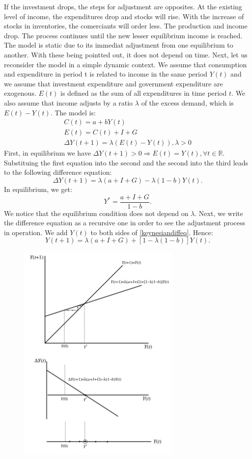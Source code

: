 \documentclass[a4paper,11pt]{report}
\newcommand{\R}{\mathbb{R}}
\begin{document}
If the investment drops, the steps for adjustment are opposites. At the existing level of income, the expenditures drop and stocks will rise. With the increase of stocks in inventories, the comerciants will order less. The production and income drop. The process continues until the new lesser equilibrium income is reached. The model is static due to its immediat adjustment from one equilibrium to another. With these being pointted out, it does not depend on time. Next, let us reconsider the model in a simple dynamic context. We assume that consumption and expenditure in period t is related to income in the same period $Y(t)$ and we assume that investment expenditure and government expenditure are exogenous. $E(t)$ is defined as the sum of all expenditures in time period $t$. We also assume that income adjusts by a ratio $\lambda$ of the excess demand, which is $E(t)-Y(t)$. The model is:
\begin{align*}
 C(t)=a+bY(t)\\
 E(t)=C(t)+I+G\\
 \Delta Y(t+1)=\lambda(E(t)-Y(t)), \lambda>0
\end{align*}
First, in equilibrium we have $\Delta Y(t+1)>0\Rightarrow E(t)=Y(t),\forall t\in\R$. Substituing the first equation into the second and the second into the third leads to the following difference equation:
\begin{equation}\label{keynesiandiffeq}
 \Delta Y(t+1)=\lambda(a+I+G)-\lambda(1-b)Y(t).
\end{equation}
In equilibrium, we get:
$$Y^{*}=\frac{a+I+G}{1-b}.$$
We notice that the equilibrium condition does not depend on $\lambda$. Next, we write the difference equation as a recursive one in order to see the adjustment process in operation. We add $Y(t)$ to both sides of \eqref{keynesiandiffeq}. Hence:
\begin{equation}
 Y(t+1)=\lambda(a+I+G)+[1-\lambda(1-b)]Y(t).
\end{equation}
\begin{figure}[h]

\centering
 \includegraphics[width=8cm]{keynesian.PNG}
\end{figure}
\end{document}
